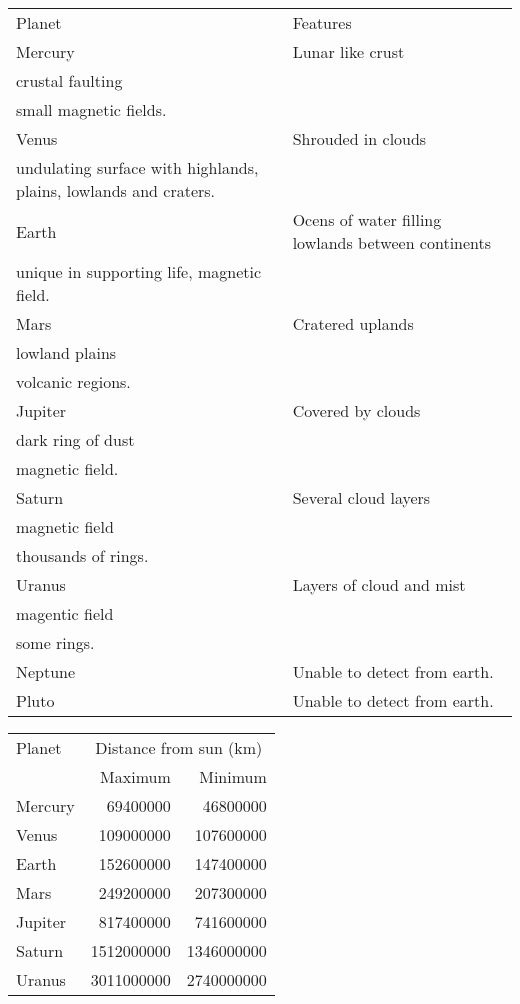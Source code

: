 \documentclass[a4paper, UTF8]{article}
\begin{document}
\begin{center}
    \begin{tabular}{lp{6cm}}
        Planet  &   Features\tabularnewline[8pt]
        Mercury &   \raggedright
                    Lunar like crust\\
                    crustal faulting\\
                    small magnetic fields.
                    \tabularnewline[3pt]
        Venus   &   \raggedright
                    Shrouded in clouds\\        
                    undulating surface with highlands, plains, lowlands and craters.
                    \tabularnewline[3pt]
        Earth   &   \raggedright
                    Ocens of water filling lowlands between continents\\
                    unique in supporting life, magnetic field.
                    \tabularnewline[3pt]
        Mars    &   \raggedright
                    Cratered uplands\\
                    lowland plains\\ 
                    volcanic regions.
                    \tabularnewline[3pt]
        Jupiter &   \raggedright
                    Covered by clouds\\
                    dark ring of dust\\
                    magnetic field.
                    \tabularnewline[3pt]
        Saturn  &   \raggedright
                    Several cloud layers\\
                    magnetic field\\
                    thousands of rings.
                    \tabularnewline[3pt]
        Uranus  &   \raggedright
                    Layers of cloud and mist\\
                    magentic field\\
                    some rings.
                    \tabularnewline[3pt] 
        Neptune &   Unable to detect from earth.\tabularnewline[3pt]
        Pluto   &   Unable to detect from earth.
    \end{tabular}
\end{center}

\begin{center}
    \begin{tabular}{l r r}
        Planet &\multicolumn{2}{c}{Distance from sun (km)}\\
                & Maximum    & Minimum\\
        Mercury & 69400000   & 46800000\\
        Venus & 109000000 & 107600000\\ 
        Earth & 152600000 & 147400000\\ 
        Mars & 249200000 & 207300000\\ 
        Jupiter & 817400000 & 741600000\\ Saturn & 1512000000 & 1346000000\\ Uranus & 3011000000 & 2740000000\\ 
    \end{tabular}
\end{center}
\end{document}
